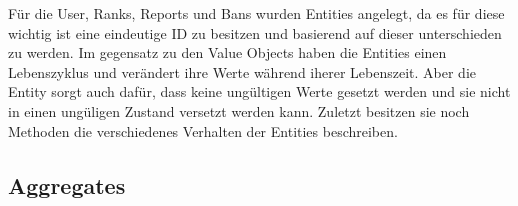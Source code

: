 


Für die User, Ranks, Reports und Bans wurden Entities angelegt,
da es für diese wichtig ist eine eindeutige ID zu besitzen und basierend auf dieser unterschieden zu werden.
Im gegensatz zu den Value Objects haben die Entities einen Lebenszyklus und verändert ihre Werte während iherer Lebenszeit.
Aber die Entity sorgt auch dafür, dass keine ungültigen Werte gesetzt werden und sie nicht in einen ungüligen Zustand versetzt werden kann.
Zuletzt besitzen sie noch Methoden die verschiedenes Verhalten der Entities beschreiben.


\subsection{Aggregates}

